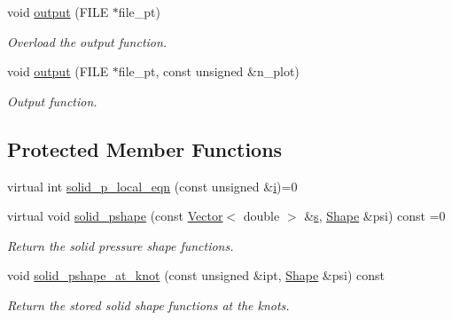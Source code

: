 \begin{DoxyCompactItemize}
void \hyperlink{classoomph_1_1AxisymmetricPVDEquationsWithPressure_ad5018c9a6f9236f13c6df43df87336aa}{output} (F\+I\+LE $\ast$file\+\_\+pt)
\begin{DoxyCompactList}\small\item\em Overload the output function. \end{DoxyCompactList}\item 
void \hyperlink{classoomph_1_1AxisymmetricPVDEquationsWithPressure_a3a6d03fa236a2e0173abbc1734799d19}{output} (F\+I\+LE $\ast$file\+\_\+pt, const unsigned \&n\+\_\+plot)
\begin{DoxyCompactList}\small\item\em Output function. \end{DoxyCompactList}\end{DoxyCompactItemize}
\subsection*{Protected Member Functions}
\begin{DoxyCompactItemize}
\item 
virtual int \hyperlink{classoomph_1_1AxisymmetricPVDEquationsWithPressure_a7b77ffb084d0967b1220898613718d0b}{solid\+\_\+p\+\_\+local\+\_\+eqn} (const unsigned \&\hyperlink{cfortran_8h_adb50e893b86b3e55e751a42eab3cba82}{i})=0
\item 
virtual void \hyperlink{classoomph_1_1AxisymmetricPVDEquationsWithPressure_ab93f05b37f8bee3a8f390e33cbcd3a6e}{solid\+\_\+pshape} (const \hyperlink{classoomph_1_1Vector}{Vector}$<$ double $>$ \&\hyperlink{cfortran_8h_ab7123126e4885ef647dd9c6e3807a21c}{s}, \hyperlink{classoomph_1_1Shape}{Shape} \&psi) const =0
\begin{DoxyCompactList}\small\item\em Return the solid pressure shape functions. \end{DoxyCompactList}\item 
void \hyperlink{classoomph_1_1AxisymmetricPVDEquationsWithPressure_a2c423c3bfbc0debcf041f11fc24d1510}{solid\+\_\+pshape\+\_\+at\+\_\+knot} (const unsigned \&ipt, \hyperlink{classoomph_1_1Shape}{Shape} \&psi) const
\begin{DoxyCompactList}\small\item\em Return the stored solid shape functions at the knots. \end{DoxyCompactList}\end{DoxyCompactItemize}
